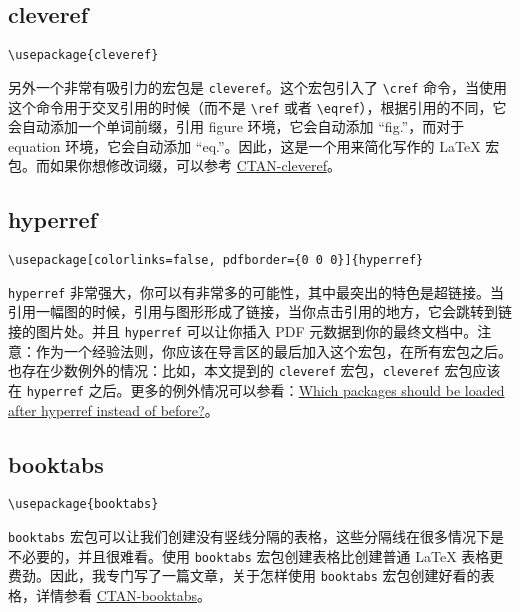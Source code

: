 \documentclass[cn]{elegantpaper}
\begin{document}
\subsection{cleveref}

\begin{lstlisting}
\usepackage{cleveref}
\end{lstlisting}

另外一个非常有吸引力的宏包是 \lstinline{cleveref}。这个宏包引入了 \lstinline|\cref| 命令，当使用这个命令用于交叉引用的时候（而不是 \lstinline|\ref| 或者 \lstinline|\eqref|），根据引用的不同，它会自动添加一个单词前缀，引用 figure 环境，它会自动添加 “fig.”，而对于 equation 环境，它会自动添加 “eq.”。因此，这是一个用来简化写作的 \LaTeX{} 宏包。而如果你想修改词缀，可以参考 \href{https://ctan.org/pkg/cleveref}{CTAN-cleveref}。

\subsection{hyperref}

\begin{lstlisting}
\usepackage[colorlinks=false, pdfborder={0 0 0}]{hyperref}
\end{lstlisting}

\lstinline{hyperref} 非常强大，你可以有非常多的可能性，其中最突出的特色是超链接。当引用一幅图的时候，引用与图形形成了链接，当你点击引用的地方，它会跳转到链接的图片处。并且 \lstinline{hyperref} 可以让你插入 PDF 元数据到你的最终文档中。注意：作为一个经验法则，你应该在导言区的最后加入这个宏包，在所有宏包之后。也存在少数例外的情况：比如，本文提到的 \lstinline{cleveref} 宏包，\lstinline{cleveref} 宏包应该在 \lstinline{hyperref} 之后。更多的例外情况可以参看：\href{http://tex.stackexchange.com/questions/1863/which-packages-should-be-loaded-after-hyperref-instead-of-before}{Which packages should be loaded after hyperref instead of before?}。

\subsection{booktabs}

\begin{lstlisting}
\usepackage{booktabs}
\end{lstlisting}

\lstinline{booktabs} 宏包可以让我们创建没有竖线分隔的表格，这些分隔线在很多情况下是不必要的，并且很难看。使用 \lstinline{booktabs} 宏包创建表格比创建普通 \LaTeX{} 表格更费劲。因此，我专门写了一篇文章，关于怎样使用 \lstinline{booktabs} 宏包创建好看的表格，详情参看 \href{https://ctan.org/pkg/booktabs}{CTAN-booktabs}。
\end{document}

